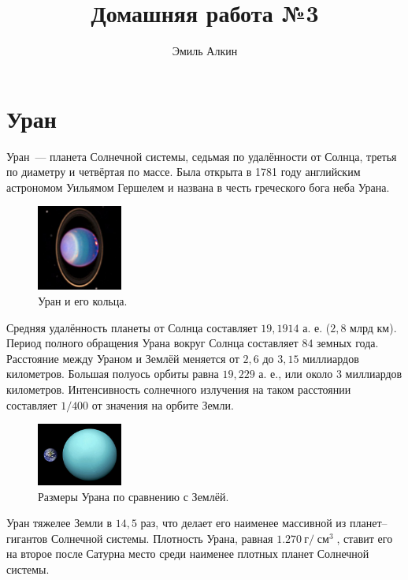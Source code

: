 \documentclass{article}
\title{Домашняя работа №3}
\author{Эмиль Алкин}
\date{}
\DeclareMathOperator{\cm}{\text{см}}
\begin{document}
	\maketitle
	\section{Уран} 
    \hspace*{12pt} Уран~--- планета Солнечной системы, седьмая по удалённости от Солнца, третья по диаметру и четвёртая по массе. Была открыта в 1781 году английским астрономом Уильямом Гершелем и названа в честь греческого бога неба Урана.\par
    \begin{figure} [h!]
    	\centering 
    	\includegraphics[width = 0.25\textwidth]{img/Uranusandrings}
    	\caption{Уран и его кольца.}
    \end{figure} 
    Средняя удалённость планеты от Солнца составляет $19,1914$ а. е. ($2,8$ млрд км). Период полного обращения Урана вокруг Солнца составляет $84$ земных года. Расстояние между Ураном и Землёй меняется от $2,6$ до $3,15$ миллиардов километров. Большая полуось орбиты равна $19,229$ а. е., или около $3$ миллиардов километров. Интенсивность солнечного излучения на таком расстоянии составляет $1/400$ от значения на орбите Земли.\par 
        \begin{figure} [h!]
    	\centering 
    	\includegraphics[width = 0.25\textwidth]{img/Uranussizecomparison}
    	\caption{Размеры Урана по сравнению с Землёй.}
    \end{figure} 
    Уран тяжелее Земли в $14,5$ раз, что делает его наименее массивной из планет--гигантов Солнечной системы. Плотность Урана, равная $1.270~\text{г}/\cm^3 $, ставит его на второе после Сатурна место среди наименее плотных планет Солнечной системы.
\end{document}
